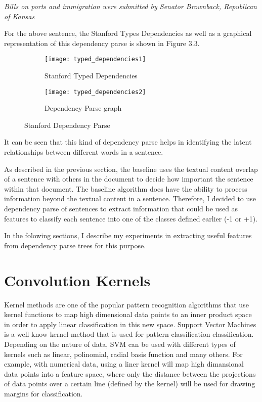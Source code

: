 \emph{Bills on ports and immigration were submitted by Senator Brownback, Republican of Kansas}

For the above sentence, the Stanford Types Dependencies as well as a graphical representation of this dependency parse is shown in Figure 3.3.

\begin{figure}[h]
\begin{subfigure}{0.5\textwidth}
\texttt{[image: typed\_dependencies1]} 
\caption{Stanford Typed Dependencies}
\label{fig:typed-dep}
\end{subfigure}
\begin{subfigure}{0.5\textwidth}
\texttt{[image: typed\_dependencies2]}
\caption{Dependency Parse graph}
\label{fig:dep-parse}
\end{subfigure}
 
\caption{Stanford Dependency Parse}
\label{fig:stanford-dep-parse}
\end{figure}

It can be seen that this kind of dependency parse helps in identifying the latent relationships between different words in a sentence.

As described in the previous section, the baseline uses the textual content overlap of a sentence with others in the document to decide how important the sentence within that document.
The baseline algorithm does have the ability to process information beyond the textual content in a sentence.
Therefore, I decided to use dependency parse of sentences to extract information that could be used as features to classify each sentence into one of the classes defined earlier (-1 or +1).

In the folowing sections, I describe my experiments in extracting useful features from dependency parse trees for this purpose.

\section{Convolution Kernels}
Kernel methods are one of the popular pattern recognition algorithms that use kernel functions to map high dimensional data points to an inner product space in order to apply linear classification in this new space.
Support Vector Machines is a well know kernel method that is used for pattern classification classification.
Depending on the nature of data, SVM can be used with different types of kernels such as linear, polinomial, radial basis function and many others.
For example, with numerical data, using a liner kernel will map high dimansional data points into a feature space, where only the distance between the projections of data points over a certain line (defined by the kernel) will be used for drawing margins for classification.

